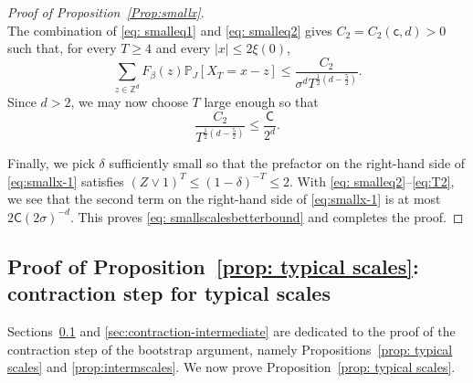 \documentclass[11pt,a4paper]{article}
\numberwithin{equation}{section}
\theoremstyle{plain}
\theoremstyle{definition}
\newcommand\1{\mathds{1}}
\newcommand\CGreen{\mathsf{C}}
\newcommand\cGreen{\mathsf{c}}
\begin{document}
\begin{proof}[Proof of Proposition~\textup{\ref{Prop:smallx}}]
\begin{equation}
\end{equation}
The combination of \eqref{eq: smalleq1} and \eqref{eq: smalleq2} gives $C_2 = C_2(\cGreen,d)>0$ such that, for every $T\geq 4$ and every $|x|\leq 2\xi(0)$,
\begin{equation}
\label{eq:T2}
    \sum_{z\in \mathbb Z^d}F_\beta(z)\mathbb P_{J}[X_T=x-z] \leq \frac{C_2}{\sigma^d T^{\frac 12 (d-\frac 52)}}.
\end{equation}
Since $d>2$, we may now choose $T$ large enough so that
\begin{equation}
	\frac{C_2}{T^{\frac 12 (d-\frac 52)}}\leq \frac{\CGreen}{2^d}.
\end{equation}

Finally, we pick $\delta$ sufficiently small so that the prefactor on the right-hand side of \eqref{eq:smallx-1} satisfies $(Z \vee 1)^T \leq (1-\delta)^{-T} \leq 2$. With \eqref{eq: smalleq2}--\eqref{eq:T2}, we see that the second term on the right-hand side of \eqref{eq:smallx-1}
is at most $2\CGreen (2\sigma)^{-d}$.  This proves \eqref{eq: smallscalesbetterbound} and completes the proof.
\end{proof}












\subsection{Proof of Proposition~\ref{prop: typical scales}: contraction step for
typical scales}
\label{sec:contraction-typical}



Sections~\ref{sec:contraction-typical} and \ref{sec:contraction-intermediate} are dedicated to the proof of the
contraction step of the bootstrap argument, namely
Propositions~\ref{prop: typical scales} and \ref{prop:intermscales}.
We now prove Proposition~\ref{prop: typical scales}.
\end{document}
